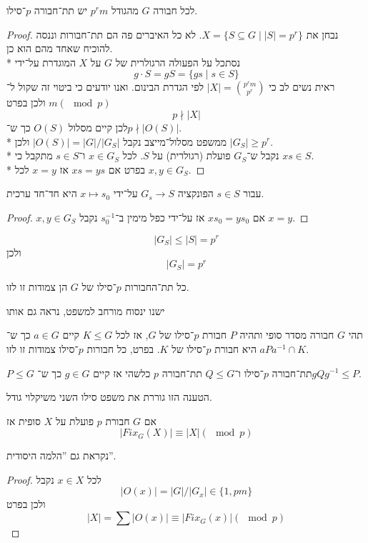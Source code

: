 \begin{theorem}
	לכל חבורה $G$ מהגודל $p^r m$ יש תת־חבורה $p$־סילו.
\end{theorem}
\begin{proof}
	נבחן את $X = \{ S \subseteq G \mid |S| = p^r \}$. לא כל האיברים פה הם תת־חבורות וננסה להוכיח שאחד מהם הוא כן. \\*
	נסתכל על הפעולה הרגולרית של $G$ על $X$ המוגדרת על־ידי
	\[
		g \cdot S = gS = \{ gs \mid s \in S \}
	\]
	ראית נשים לב כי  $|X| = \binom{p^r m}{p^r}$ לפי הגדרת הבינום.
	ואנו יודעים כי ביטוי זה שקול ל־$m (\mod p)$ ולכן בפרט
	\[
		p \nmid |X|
	\]
	לכן קיים מסלול $O(S)$ כך ש־$p \nmid |O(S)|$. \\*
	ממשפט מסלול־מייצב נקבל $|O(S)| = |G| / |G_S|$ ולכן $|G_S| \ge p^r$. \\*
	נקבל ש־$G_S$ פועלת (רגולרית) על $S$.
	לכל $x \in G_S$ ו־$s \in S$ מתקבל כי $xs \in S$. \\*
	בפרט אם $xs = ys$ אז $x = y$ לכל $x, y \in G_S$.
\end{proof}
\begin{lemma}
	עבור $s \in S$ הפונקציה $G_s \to S$ על־ידי $x \mapsto s_0$ היא חד־חד ערכית.
\end{lemma}
\begin{proof}
	$x, y \in G_S$ אם $xs_0 = ys_0$ אז על־ידי כפל מימין ב־$s_0^{-1}$ נקבל $x = y$.
\end{proof}
\begin{conclusion}
	\[
		|G_S| \le |S| = p^r
	\]
	ולכן
	\[
		|G_S| = p^r
	\]
\end{conclusion}
\begin{theorem}
	כל תת־החבורות $p$־סילו של $G$ הן צמודות זו לזו.
\end{theorem}
ישנו ינסוח מורחב למשפט, נראה גם אותו
\begin{theorem}
	תהי $G$ חבורה מסדר סופי ותהיה $P$ חבורת $p$־סילו של $G$, אז לכל $K \le G$ קיים $a \in G$ כך ש־$a P a^{-1} \cap K$ היא חבורת $p$־סילו של $K$.
	בפרט, כל חבורות $p$־סילו צמודות זו לזו.
\end{theorem}
\begin{proposition}
	$P \le G$ תת־חבורה $p$־סילו ו־$Q \le G$ תת־חבורה $p$ כלשהי אז קיים $g \in G$ כך ש־$g Q g^{-1} \le P$.
\end{proposition}
הטענה הזו גוררת את משפט סילו השני משיקלוי גודל.
\begin{lemma}
	אם $G$ חבורת $p$ פועלת על $X$ סופית אז
	\[
		|Fix_G(X)| \equiv |X| (\mod p)
	\]
\end{lemma}
נקראת גם ''הלמה היסודית''.
\begin{proof}
	לכל $x \in X$ נקבל
	\[
		|O(x)| = |G| / |G_x| \in \{ 1, pm \}
	\]
	ולכן בפרט
	\[
		|X| = \sum |O(x)| \equiv |Fix_G(x)| (\mod p)
	\]
\end{proof}

